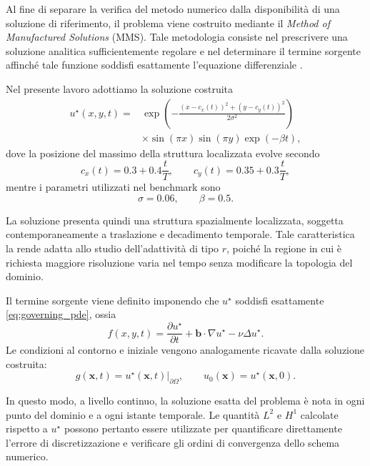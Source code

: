 Al fine di separare la verifica del metodo numerico dalla disponibilità di una soluzione di riferimento, il problema viene costruito mediante il \textit{Method of Manufactured Solutions} (MMS). Tale metodologia consiste nel prescrivere una soluzione analitica sufficientemente regolare e nel determinare il termine sorgente affinché tale funzione soddisfi esattamente l'equazione differenziale \citep{farrell2011automated}.

Nel presente lavoro adottiamo la soluzione costruita
\begin{equation}
\begin{aligned}
u^\star(x,y,t) ={}& \exp\left( -\frac{(x-c_x(t))^2 + (y-c_y(t))^2}{2\sigma^2} \right) \\
& \times \sin(\pi x) \sin(\pi y) \exp(-\beta t),
\end{aligned}
\label{eq:manufactured_solution}
\end{equation}
dove la posizione del massimo della struttura localizzata evolve secondo
\begin{equation}
c_x(t)=0.3+0.4\frac{t}{T},
\qquad
c_y(t)=0.35+0.3\frac{t}{T},
\label{eq:center_motion}
\end{equation}
mentre i parametri utilizzati nel benchmark sono
\begin{equation}
\sigma=0.06,
\qquad
\beta=0.5.
\label{eq:mms_parameters}
\end{equation}

La soluzione presenta quindi una struttura spazialmente localizzata, soggetta contemporaneamente a traslazione e decadimento temporale. Tale caratteristica la rende adatta allo studio dell'adattività di tipo $r$, poiché la regione in cui è richiesta maggiore risoluzione varia nel tempo senza modificare la topologia del dominio.

Il termine sorgente viene definito imponendo che $u^\star$ soddisfi esattamente \eqref{eq:governing_pde}, ossia
\begin{equation}
f(x,y,t)
=
\frac{\partial u^\star}{\partial t}
+
\mathbf{b}\cdot\nabla u^\star
-
\nu\Delta u^\star.
\label{eq:mms_forcing}
\end{equation}
Le condizioni al contorno e iniziale vengono analogamente ricavate dalla soluzione costruita:
\begin{equation}
g(\mathbf{x},t)
=
u^\star(\mathbf{x},t)
\big|_{\partial\Omega},
\qquad
u_0(\mathbf{x})
=
u^\star(\mathbf{x},0).
\label{eq:mms_bc_ic}
\end{equation}

In questo modo, a livello continuo, la soluzione esatta del problema è nota in ogni punto del dominio e a ogni istante temporale. Le quantità $L^2$ e $H^1$ calcolate rispetto a $u^\star$ possono pertanto essere utilizzate per quantificare direttamente l'errore di discretizzazione e verificare gli ordini di convergenza dello schema numerico.

